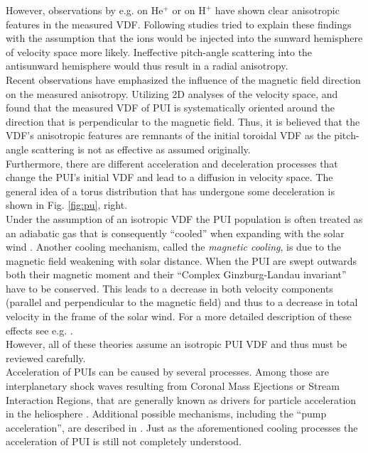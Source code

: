 However, observations by e.g. \citet{moebius_98} on $\mathrm{He^{+}}$ or \citet{gloeckler_1995} on $\mathrm{H^{+}}$ have shown clear anisotropic features in the measured VDF. Following studies \citep[e.g.][]{isenberg} tried to explain these findings with the assumption that the ions would be injected into the sunward hemisphere of velocity space more likely. Ineffective pitch-angle scattering into the antisunward hemisphere would thus result in a radial anisotropy.
\\
Recent observations have emphasized the influence of the magnetic field direction on the measured anisotropy. Utilizing 2D analyses of the velocity space, \citet{oka_2002} and \citet{drews_2015} found that the measured VDF of PUI is systematically oriented around the direction that is perpendicular to the magnetic field. Thus, it is believed that the VDF's anisotropic features are remnants of the initial toroidal VDF as the pitch-angle scattering is not as effective as assumed originally.\\
Furthermore, there are different acceleration and deceleration processes that change the PUI's initial VDF and lead to a diffusion in velocity space. The general idea of a torus distribution that has undergone some deceleration is shown in Fig. \ref{fig:pu}, right.\\
Under the assumption of an isotropic VDF the PUI population is often treated as an adiabatic gas that is consequently ``cooled'' when expanding with the solar wind \citep{vasyl_siscoe_1976}. Another cooling mechanism, called the \textit{magnetic cooling}, is due to the magnetic field weakening with solar distance. When the PUI are swept outwards both their magnetic moment and their ``Complex Ginzburg-Landau invariant'' \citep{fahr} have to be conserved. This leads to a decrease in both velocity components (parallel and perpendicular to the magnetic field) and thus to a decrease in total velocity in the frame of the solar wind. For a more detailed description of these effects see e.g. \citet{fahr_fichtner}.\\
However, all of these theories assume an isotropic PUI VDF and thus must be reviewed carefully.\\
Acceleration of PUIs can be caused by several processes. Among those are interplanetary shock waves resulting from Coronal Mass Ejections or Stream Interaction Regions, that are generally known as drivers for particle acceleration in the heliosphere \citep[Ch. 7.5]{kallenrode}. Additional possible mechanisms, including the ``pump acceleration'', are described in \citet{fisk_gloeckler2012}. Just as the aforementioned cooling processes the acceleration of PUI is still not completely understood.